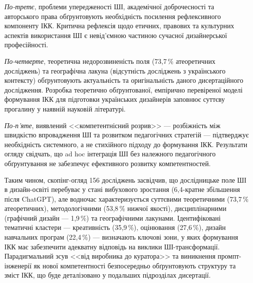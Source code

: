 \textit{По-третє}, проблеми упередженості ШІ, академічної доброчесності та авторського права обґрунтовують необхідність посилення рефлексивного компоненту ІКК. Критична рефлексія щодо етичних, правових та культурних аспектів використання ШІ є невід'ємною частиною сучасної дизайнерської професійності.

\textit{По-четверте}, теоретична недорозвиненість поля (73,7\,\% атеоретичних досліджень) та географічна лакуна (відсутність досліджень з українського контексту) обґрунтовують актуальність та оригінальність даного дисертаційного дослідження. Розробка теоретично обґрунтованої, емпірично перевіреної моделі формування ІКК для підготовки українських дизайнерів заповнює суттєву прогалину у наявній науковій літературі.

\textit{По-п'яте}, виявлений <<компетентнісний розрив>> --- розбіжність між швидкістю впровадження ШІ та розвитком педагогічних стратегій --- підтверджує необхідність системного, а не стихійного підходу до формування ІКК. Результати огляду свідчать, що ad hoc інтеграція ШІ без належного педагогічного обґрунтування не забезпечує ефективного розвитку компетентностей.

Таким чином, скопінг-огляд 156 досліджень засвідчив, що дослідницьке поле ШІ в дизайн-освіті перебуває у стані вибухового зростання (6,4-кратне збільшення після ChatGPT), але водночас характеризується суттєвими теоретичними (73,7\,\% атеоретичних), методологічними (53,8\,\% нижчої якості), дисциплінарними (графічний дизайн --- 1,9\,\%) та географічними лакунами. Ідентифіковані тематичні кластери --- креативність (35,9\,\%), оцінювання (27,6\,\%), дизайн навчальних програм (22,4\,\%) --- визначають ключові зони, у яких формування ІКК має забезпечити адекватну відповідь на виклики ШІ-трансформації. Парадигмальний зсув <<від виробника до куратора>> та виникнення промпт-інженерії як нової компетентності безпосередньо обґрунтовують структуру та зміст ІКК, що буде деталізовано у подальших підрозділах дисертації.
